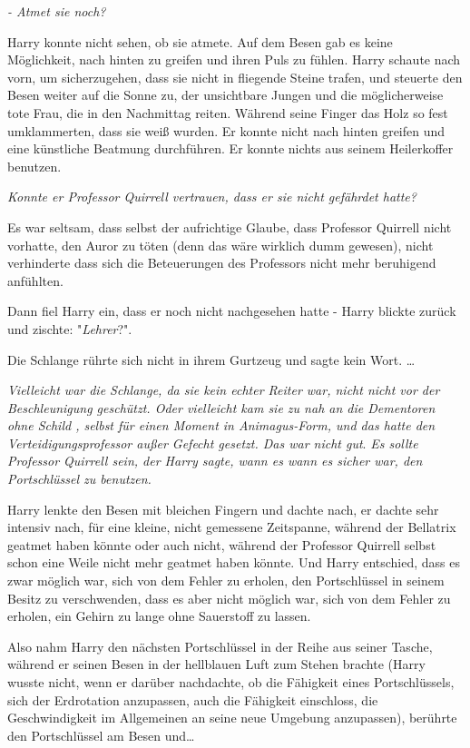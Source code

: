 {\emph{- Atmet sie noch?}

Harry konnte nicht sehen, ob sie atmete. Auf dem Besen gab es keine Möglichkeit, nach hinten zu greifen und ihren Puls zu fühlen. Harry schaute nach vorn, um sicherzugehen, dass sie nicht in fliegende Steine trafen, und steuerte den Besen weiter auf die Sonne zu, der unsichtbare Jungen und die möglicherweise tote Frau, die in den Nachmittag reiten. Während seine Finger das Holz so fest umklammerten, dass sie weiß wurden. Er konnte nicht nach hinten greifen und eine künstliche Beatmung durchführen. Er konnte nichts aus seinem Heilerkoffer benutzen.

\emph{Konnte er Professor Quirrell vertrauen, dass er sie nicht gefährdet hatte?}

Es war seltsam, dass selbst der aufrichtige Glaube, dass Professor Quirrell nicht vorhatte, den Auror zu töten (denn das wäre wirklich dumm gewesen), nicht verhinderte dass sich die Beteuerungen des Professors nicht mehr beruhigend anfühlten.

Dann fiel Harry ein, dass er noch nicht nachgesehen hatte - Harry blickte zurück und zischte: "\emph{Lehrer}?".

Die Schlange rührte sich nicht in ihrem Gurtzeug und sagte kein Wort. …

\emph{Vielleicht war die Schlange, da sie kein echter Reiter war, nicht nicht vor der Beschleunigung geschützt. Oder vielleicht kam sie zu nah an die Dementoren ohne Schild , selbst für einen Moment in Animagus-Form, und das hatte den Verteidigungsprofessor außer Gefecht gesetzt. Das war nicht gut}. \emph{Es sollte Professor Quirrell sein, der Harry sagte, wann es wann es sicher war, den Portschlüssel zu benutzen.}

Harry lenkte den Besen mit bleichen Fingern und dachte nach, er dachte sehr intensiv nach, für eine kleine, nicht gemessene Zeitspanne, während der Bellatrix geatmet haben könnte oder auch nicht, während der Professor Quirrell selbst schon eine Weile nicht mehr geatmet haben könnte. Und Harry entschied, dass es zwar möglich war, sich von dem Fehler zu erholen, den Portschlüssel in seinem Besitz zu verschwenden, dass es aber nicht möglich war, sich von dem Fehler zu erholen, ein Gehirn zu lange ohne Sauerstoff zu lassen.

Also nahm Harry den nächsten Portschlüssel in der Reihe aus seiner Tasche, während er seinen Besen in der hellblauen Luft zum Stehen brachte (Harry wusste nicht, wenn er darüber nachdachte, ob die Fähigkeit eines Portschlüssels, sich der Erdrotation anzupassen, auch die Fähigkeit einschloss, die Geschwindigkeit im Allgemeinen an seine neue Umgebung anzupassen), berührte den Portschlüssel am Besen und…

}
